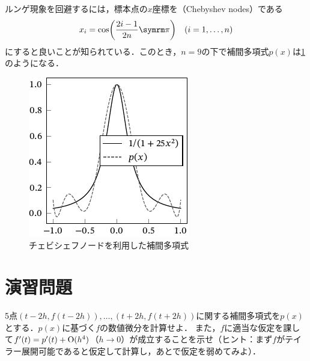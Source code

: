 \documentclass[../../main]{subfiles}
\begin{document}
ルンゲ現象を回避するには，標本点の\(x\)座標を（Chebyshev nodes）である
\[
  x_i = \cos\pqty*{\frac{2i-1}{2n}\krez}\quad (i=1,\dots,n)
\]
にすると良いことが知られている\cite{horinouchi2015}．このとき，\(n=9\)の下で補間多項式\(p(x)\)は\cref{figure:chebyshev}のようになる．

\begin{figure}[htbp]
  \centering
  \includegraphics{chebyshev.pdf}
  \caption{チェビシェフノードを利用した補間多項式}
  \label{figure:chebyshev}
\end{figure}

\section*{演習問題}
\begin{problem}
5点\((t-2h,f(t-2h)),\dots,(t+2h,f(t+2h))\)に関する補間多項式を\(p(x)\)とする．\(p(x)\)に基づく\(f\)の数値微分を計算せよ．
また，\(f\)に適当な仮定を課して\(f'(t)=p'(t)+\operatorname{O}(h^4)\)（\(h\to 0\)）が成立することを示せ（ヒント：まず\(f\)がテイラー展開可能であると仮定して計算し，あとで仮定を弱めてみよ）．
\end{problem}
\end{document}
